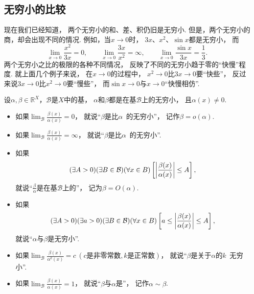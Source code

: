 \subsection{无穷小的比较}
现在我们已经知道，
两个无穷小的和、差、积仍旧是无穷小.
但是，两个无穷小的商，却会出现不同的情况.
例如，当\(x\to0\)时，
\(3x\)、\(x^2\)、\(\sin x\)都是无穷小，
而\[
	\lim_{x\to0}\frac{x^2}{3x}=0, \qquad
	\lim_{x\to0}\frac{3x}{x^2}=\infty, \qquad
	\lim_{x\to0}\frac{\sin x}{3x}=\frac{1}{3}.
\]
两个无穷小之比的极限的各种不同情况，
反映了不同的无穷小趋于零的“快慢”程度.
就上面几个例子来说，
在\(x\to0\)的过程中，
\(x^2\to0\)比\(3x\to0\)要“快些”，
反过来说\(3x\to0\)比\(x^2\to0\)要“慢些”，
而\(\sin x\to0\)与\(x\to0\)“快慢相仿”.

\begin{definition}
设\(\alpha,\beta\in\mathbb{R}^X\)，\(\mathcal{B}\)是\(X\)中的基，
\(\alpha\)和\(\beta\)都是在基\(\mathcal{B}\)上的无穷小，
且\(\alpha(x)\neq0\).
\newcommand{\lf}[1][]{\lim_\mathcal{B} \frac{\beta(x)}{\alpha^{#1}(x)}}
\begin{itemize}
	\item 如果\(\lf=0\)，
	就说“\(\beta\)是比\(\alpha\)~的无穷小”，
	记作\(\beta=o(\alpha)\).

	\item 如果\(\lf=\infty\)，
	就说“\(\beta\)是比\(\alpha\)~的无穷小”.

	\item 如果\[
		(\exists A>0)
		(\exists B\in\mathcal{B})
		(\forall x\in B)
		\left[
			\abs{\frac{\beta(x)}{\alpha(x)}} \leq A
		\right],
	\]
	就说“\(\frac\beta\alpha\)是在基\(\mathcal{B}\)上的”，
	记为\(\beta = O(\alpha)\).

	\item 如果\[
		(\exists A>0)
		(\exists a>0)
		(\exists B\in\mathcal{B})
		(\forall x\in B)
		\left[
			a \leq \abs{\frac{\beta(x)}{\alpha(x)}} \leq A
		\right],
	\]
	就说“\(\alpha\)与\(\beta\)是无穷小”.

	\item 如果\(\lf[k]=c\ (\text{$c$是非零常数},\text{$k$是正常数})\)，
	就说“\(\beta\)是关于\(\alpha\)的\(k\)~无穷小”.

	\item 如果\(\lf=1\)，
	就说“\(\beta\)与\(\alpha\)是”，
	记作\(\alpha\sim\beta\).
\end{itemize}
\end{definition}

